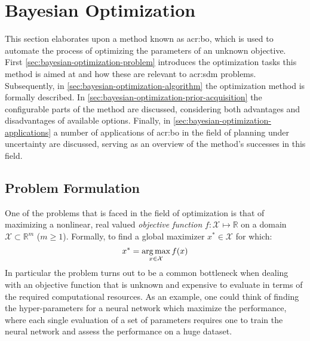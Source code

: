 \section{Bayesian Optimization}
\label{sec:bayesian-optimization}

This section elaborates upon a method known as \acrfull{acr:bo}, which is used to automate the process of optimizing the parameters of an unknown objective.
First \autoref{sec:bayesian-optimization-problem} introduces the optimization tasks this method is aimed at and how these are relevant to \acrshort{acr:sdm} problems.
Subsequently, in \autoref{sec:bayesian-optimization-algorithm} the optimization method is formally described.
In \autoref{sec:bayesian-optimization-prior-acquisition} the configurable parts of the method are discussed, considering both advantages and disadvantages of available options.
Finally, in \autoref{sec:bayesian-optimization-applications} a number of applications of \acrlong{acr:bo} in the field of planning under uncertainty are discussed, serving as an overview of the method's successes in this field.


\subsection{Problem Formulation}
\label{sec:bayesian-optimization-problem}

One of the problems that is faced in the field of optimization is that of maximizing a nonlinear, real valued \textit{objective function} $f: \mathcal{X} \mapsto \mathbb{R}$ on a domain $\mathcal{X} \subset \mathbb{R}^m$ ($m \geq 1$).
Formally, to find a global maximizer $x^\ast \in \mathcal{X}$ for which:
\begin{equation}
	x^\ast = \operatorname*{arg\,max}_{x \in \mathcal{X}} f(x)
\end{equation}
In particular the problem turns out to be a common bottleneck when dealing with an objective function that is unknown and expensive to evaluate in terms of the required computational resources.
As an example, one could think of finding the hyper-parameters for a neural network which maximize the performance, where each single evaluation of a set of parameters requires one to train the neural network and assess the performance on a huge dataset.

